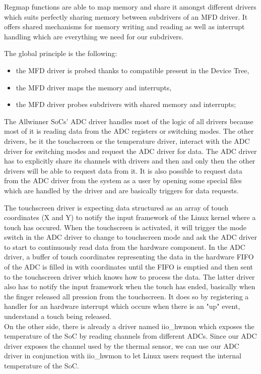 Regmap functions are able to map memory and share it amongst different drivers which suits perfectly sharing memory between subdrivers of an MFD driver. It offers shared mechanisms for memory writing and reading as well as interrupt handling which are everything we need for our subdrivers.

The global principle is the following:

\begin{itemize}
  \item the MFD driver is probed thanks to compatible present in the Device Tree,
  \item the MFD driver maps the memory and interrupts,
  \item the MFD driver probes subdrivers with shared memory and interrupts;
\end{itemize}

The Allwinner SoCs' ADC driver handles most of the logic of all drivers because most of it is reading data from the ADC registers or switching modes. The other drivers, be it the touchscreen or the temperature driver, interact with the ADC driver for switching modes and request the ADC driver for data. The ADC driver has to explicitly share its channels with drivers and then and only then the other drivers will be able to request data from it. It is also possible to request data from the ADC driver from the system as a user by opening some special files which are handled by the driver and are basically triggers for data requests.

The touchscreen driver is expecting data structured as an array of touch coordinates (X and Y) to notify the input framework of the Linux kernel where a touch has occured. When the touchscreen is activated, it will trigger the mode switch in the ADC driver to change to touchscreen mode and ask the ADC driver to start to continuously read data from the hardware component. In the ADC driver, a buffer of touch coordinates representing the data in the hardware FIFO of the ADC is filled in with coordinates until the FIFO is emptied and then sent to the touchscreen driver which knows how to process the data. The latter driver also has to notify the input framework when the touch has ended, basically when the finger released all pression from the touchscreen. It does so by registering a handler for an hardware interrupt which occurs when there is an "up" event, understand a touch being released.\\
On the other side, there is already a driver named iio\_hwmon which exposes the temperature of the SoC by reading channels from different ADCs. Since our ADC driver exposes the channel used by the thermal sensor, we can use our ADC driver in conjunction with iio\_hwmon to let Linux users request the internal temperature of the SoC.

